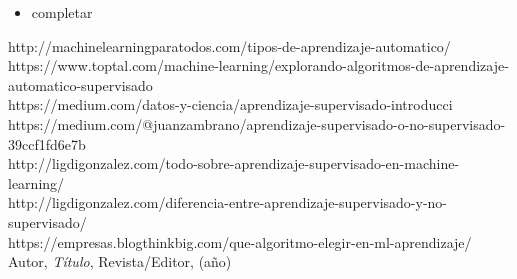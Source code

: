 \documentclass[%
 reprint,
 amsmath,amssymb,
 aps,
]{revtex4-1}
\begin{document}
\begin{itemize}
\item 
completar

\end{itemize}

\newpage

\begin{thebibliography}{99}
http://machinelearningparatodos.com/tipos-de-aprendizaje-automatico/\\
https://www.toptal.com/machine-learning/explorando-algoritmos-de-aprendizaje-automatico-supervisado\\
https://medium.com/datos-y-ciencia/aprendizaje-supervisado-introducci%
https://medium.com/@juanzambrano/aprendizaje-supervisado-o-no-supervisado-39ccf1fd6e7b\\
http://ligdigonzalez.com/todo-sobre-aprendizaje-supervisado-en-machine-learning/\\
http://ligdigonzalez.com/diferencia-entre-aprendizaje-supervisado-y-no-supervisado/\\
https://empresas.blogthinkbig.com/que-algoritmo-elegir-en-ml-aprendizaje/\\

 Autor, \emph{Título}, Revista/Editor, (año)

\end{thebibliography}
\end{document}
